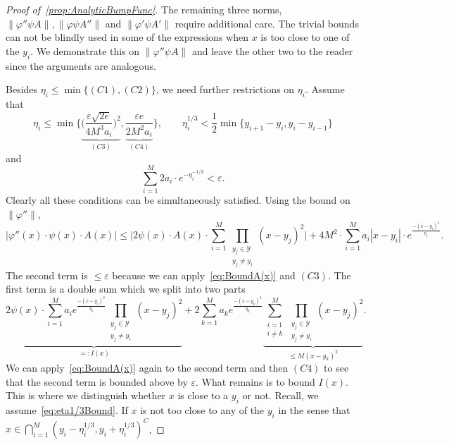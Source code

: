 \documentclass[11pt,]{article}
\def\cref#1{\ref{#1}}%
\theoremstyle{definition}
\theoremstyle{remark}
\newcommand{\0}{\mathbf{0}}
\begin{document}
\begin{proof}[Proof of~\cref{prop:AnalyticBumpFunc}]
The remaining three norms, $\|\varphi'' \psi A\|,\|\varphi \psi A''\|$ and $\|\varphi' \psi A'\|$
require additional care. The trivial bounds can not be blindly used in some of the expressions when
$x$ is too close to one of the $y_i$. We demonstrate this on $\|\varphi'' \psi A\|$ and leave the
other two to the reader since the arguments are analogous.

Besides $\eta_i\leq\min\{(C1),(C2)\}$, we need further restrictions on $\eta_i$. Assume that
\begin{equation}\label{eq:eta1/3Bound}
	\eta_i\leq \min \bigg\{ \underbrace{ \Big( \frac{\varepsilon\sqrt{2e}}{4M^3a_i} \Big)^2
	}_{(C3)}, \underbrace{ \frac{\varepsilon e}{2M^2a_i} }_{(C4)} \bigg\},\qquad
	\eta_i^{1/3} < \frac{1}{2} \min\big\{ y_{i+1}-y_i, y_i-y_{i-1} \big\} 
\end{equation}
and
\begin{equation}\label{eq:etaOtherBound}
	\sum_{i=1}^M 2a_i\cdot e^{-\eta_i^{-1/3}} < \varepsilon.
\end{equation}
Clearly all these conditions can be simultaneously satisfied. Using the bound on $\|\varphi''\|$,
\begin{equation*}
	\big|\varphi''(x)\cdot \psi(x)\cdot A(x)\big|\leq  \bigg| 2\psi(x)\cdot A(x)\cdot
	\sum_{i=1}^{M}  \prod_{\substack{y_j\in\mathcal{Y}\\ y_j\neq y_i}} (x-y_j)^2 \bigg| +
	4M^2\cdot \sum_{i=1}^{M} a_i|x-y_i| \cdot e^{\frac{-(x-y_i)^2}{\eta_i}}.
\end{equation*}
The second term is $\leq \varepsilon$ because we can apply~\cref{eq:BoundA(x)} and $(C3)$. The first
term is a double sum which we split into two parts
\begin{equation*}
	\underbrace{2\psi(x)\cdot  \sum_{i=1}^{M} a_i e^{\frac{-(x-y_i)^2}{\eta_i}}
	\prod_{\substack{y_j\in\mathcal{Y}\\ y_j\neq y_i}} (x-y_j)^2}_{=: I(x)} +
	2 \sum_{k=1}^{M}  a_k  e^{\frac{-(x-y_k)^2}{\eta_k}} \underbrace{\sum_{\substack{i=1 \\
	i\neq k}}^{M} \prod_{\substack{y_j\in\mathcal{Y}\\ y_j\neq y_i}} (x-y_j)^2}_{\leq
      M(x-y_k)^2}.
\end{equation*} 
We can apply~\cref{eq:BoundA(x)} again to the second term and then $(C4)$ to see that the second
term is bounded above by $\varepsilon$. What remains is to bound $I(x)$. This is where we distinguish whether
$x$ is close to a $y_i$ or not. Recall, we assume~\cref{eq:eta1/3Bound}. If $x$ is not too close to
any of the $y_i$ in the sense that $x\in\bigcap_{i=1}^M (y_i-\eta_i^{1/3}, y_i+\eta_i^{1/3})^C$,

\end{proof}
\end{document}
